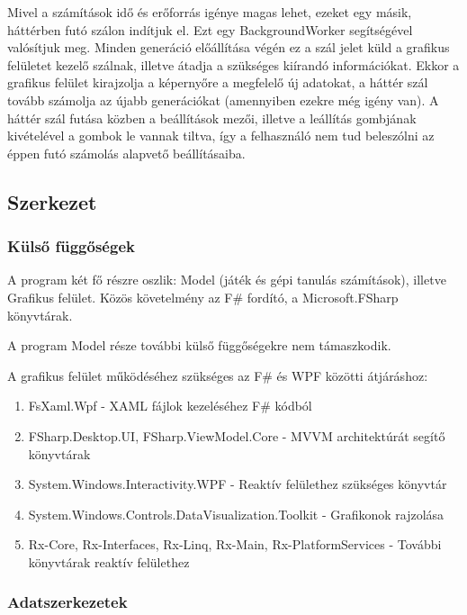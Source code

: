 \documentclass[12pt]{article}
\begin{document}
	Mivel a számítások idő és erőforrás igénye magas lehet, ezeket egy másik, háttérben futó szálon indítjuk el. Ezt egy BackgroundWorker segítségével valósítjuk meg. Minden generáció előállítása végén ez a szál jelet küld a grafikus felületet kezelő szálnak, illetve átadja a szükséges kiírandó információkat. Ekkor a grafikus felület kirajzolja a képernyőre a megfelelő új adatokat, a háttér szál tovább számolja az újabb generációkat (amennyiben ezekre még igény van). A háttér szál futása közben a beállítások mezői, illetve a leállítás gombjának kivételével a gombok le vannak tiltva, így a felhasználó nem tud beleszólni az éppen futó számolás alapvető beállításaiba.
	
	\subsection{Szerkezet}
	
	\subsubsection{Külső függőségek}
	
	A program két fő részre oszlik: Model (játék és gépi tanulás számítások), illetve Grafikus felület.
	Közös követelmény az F\# fordító, a Microsoft.FSharp könyvtárak.
	
	A program Model része további külső függőségekre nem támaszkodik.
	
	A grafikus felület működéséhez szükséges az F\# és WPF közötti átjáráshoz:
	
	\begin{enumerate}
		\item FsXaml.Wpf - XAML fájlok kezeléséhez F\# kódból
		\item FSharp.Desktop.UI, FSharp.ViewModel.Core - MVVM architektúrát segítő könyvtárak
		\item System.Windows.Interactivity.WPF - Reaktív felülethez szükséges könyvtár
		\item System.Windows.Controls.DataVisualization.Toolkit - Grafikonok rajzolása
		\item Rx-Core, Rx-Interfaces, Rx-Linq, Rx-Main, Rx-PlatformServices - További könyvtárak reaktív felülethez
	\end{enumerate}
	
	\subsubsection{Adatszerkezetek}
	
\end{document}
